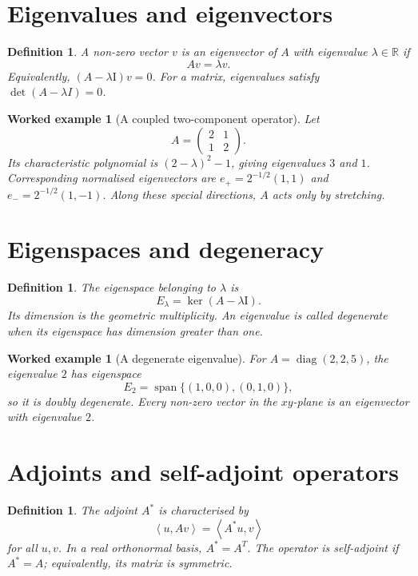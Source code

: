 \documentclass[11pt,a5paper,oneside,openany]{scrreprt}
\theoremstyle{notes}
\theoremstyle{definitions}
\newtheorem{definition}[theorem]{Definition}
\newtheorem{example}[theorem]{Worked example}
\newcommand{\R}{\mathbb{R}}
\newcommand{\ip}[2]{\left\langle #1,#2\right\rangle}
\newcommand{\Span}{\operatorname{span}}
\newcommand{\Ker}{\operatorname{ker}}
\newcommand{\Id}{\mathrm{I}}
\begin{document}
\section{Eigenvalues and eigenvectors}

\begin{definition}
A non-zero vector $v$ is an eigenvector of $A$ with eigenvalue $\lambda\in\R$
if
\[
  \boxed{Av=\lambda v}.
\]
Equivalently, $(A-\lambda\Id)v=0$.  For a matrix, eigenvalues satisfy
$\det(A-\lambda I)=0$.
\end{definition}

\begin{example}[A coupled two-component operator]
Let
\[
 A=\begin{pmatrix}2&1\\1&2\end{pmatrix}.
\]
Its characteristic polynomial is $(2-\lambda)^2-1$, giving eigenvalues
$3$ and $1$.  Corresponding normalised eigenvectors are
$e_+=2^{-1/2}(1,1)$ and $e_-=2^{-1/2}(1,-1)$.  Along these special directions,
$A$ acts only by stretching.
\end{example}

\section{Eigenspaces and degeneracy}

\begin{definition}
The eigenspace belonging to $\lambda$ is
\[
  E_\lambda=\Ker(A-\lambda\Id).
\]
Its dimension is the geometric multiplicity.  An eigenvalue is called
degenerate when its eigenspace has dimension greater than one.
\end{definition}

\begin{example}[A degenerate eigenvalue]
For $A=\operatorname{diag}(2,2,5)$, the eigenvalue $2$ has eigenspace
\[
 E_2=\Span\{(1,0,0),(0,1,0)\},
\]
so it is doubly degenerate.  Every non-zero vector in the $xy$-plane is an
eigenvector with eigenvalue $2$.
\end{example}

\section{Adjoints and self-adjoint operators}

\begin{definition}
The adjoint $A^*$ is characterised by
\[
  \boxed{\ip{u}{Av}=\ip{A^*u}{v}}
\]
for all $u,v$.  In a real orthonormal basis, $A^*=A^T$.  The operator is
self-adjoint if $A^*=A$; equivalently, its matrix is symmetric.
\end{definition}
\end{document}

